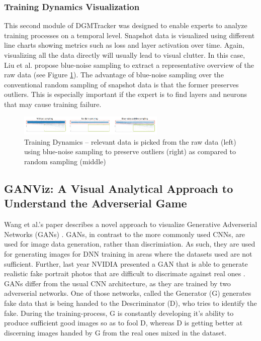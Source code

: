 \documentclass{acmsiggraph}               %
\begin{document}
\subsubsection{Training Dynamics Visualization}
This second module of DGMTracker was designed to enable experts to analyze training processes on a temporal level.
Snapshot data is visualized using different line charts showing metrics such as loss and layer activation over time. Again, visualizing all the data directly will usually lead to visual clutter. In this case, Liu et al. propose blue-noise sampling to extract a representative overview of the raw data (see Figure \ref{fig:mengchen4}). The advantage of blue-noise sampling over the conventional random sampling of snapshot data is that the former preserves outliers. This is especially important if the expert is to find layers and neurons that may cause training failure.

\begin{figure}[!htb]
  \centering
  \includegraphics[width=2.75in]{mengchen4}
  \caption{Training Dynamics -- relevant data is picked from the raw data (left) using blue-noise sampling to preserve outliers (right) as compared to random sampling (middle) \protect\cite{Liu2018}}
  \label{fig:mengchen4}
\end{figure}

\subsection{GANViz: A Visual Analytical Approach to Understand the Adverserial Game}
Wang et al.'s paper describes a novel approach to visualize Generative Adverserial Networks (GANs) \protect\cite{Wang}. GANs, in contrast to the more commonly used CNNs, are used for image data generation, rather than discrimiation. As such, they are used for generating images for DNN training in areas where the datasets used are not sufficient. Further, last year NVIDIA presented a GAN that is able to generate realistic fake portrait photos that are difficult to discrimate against real ones \protect\cite{KarrasNVIDIA}. 
GANs differ from the usual CNN architecture, as they are trained by two adverserial networks. One of those networks, called the Generator (G) generates fake data that is being handed to the Descriminator (D), who tries to identify the fake. During the training-process, G is constantly developing it's ability to produce sufficient good images so as to fool D, whereas D is getting better at discerning images handed by G from the real ones mixed in the dataset.\\
\end{document}
